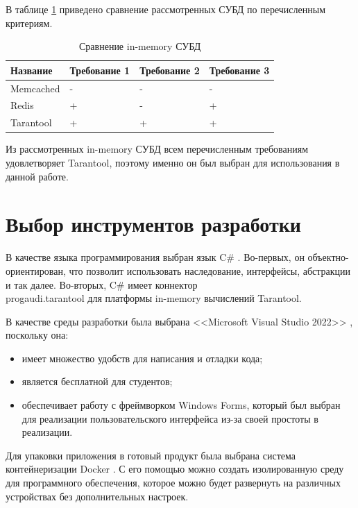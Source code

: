В таблице \ref{tbl:imdb} приведено сравнение рассмотренных СУБД по перечисленным критериям.

\captionsetup{justification=raggedleft,singlelinecheck=off}
\begin{table}[H]
	\centering
	\caption{Сравнение in-memory СУБД}
	\label{tbl:imdb}
	\begin{tabular}{|l|l|l|l|} 
	\hline
	Название  & Требование 1 & Требование 2 & Требование 3  \\ 
	\hline
	Memcached & -            & -            & -             \\ 
	\hline
	Redis     & +            & -            & +             \\ 
	\hline
	Tarantool & +            & +            & +             \\
	\hline
\end{tabular}
\end{table}


Из рассмотренных in-memory СУБД всем перечисленным требованиям удовлетворяет Tarantool, поэтому именно он был выбран для использования в данной работе.




\section{Выбор инструментов разработки}

В качестве языка программирования выбран язык C\# \cite{sharp}. Во-первых, он объектно-ориентирован, что позволит использовать наследование, интерфейсы, абстракции и так далее. Во-вторых, C\# имеет коннектор \\progaudi.tarantool \cite{connector} для платформы in-memory вычислений Tarantool.


В качестве среды разработки была выбрана <<Microsoft Visual Studio 2022>> \cite{vs}, поскольку она:
\begin{itemize}
	\item[1)] имеет множество удобств для написания и отладки кода;
	\item[2)] является бесплатной для студентов;
	\item[3)] обеспечивает работу с фреймворком Windows Forms\cite{wf}, который был выбран для реализации пользовательского интерфейса из-за своей простоты в реализации.  
\end{itemize}

Для упаковки приложения в готовый продукт была выбрана система контейнеризации Docker \cite{docker}. С его помощью можно создать изолированную среду для программного обеспечения, которое можно будет развернуть на различных устройствах без дополнительных настроек.

